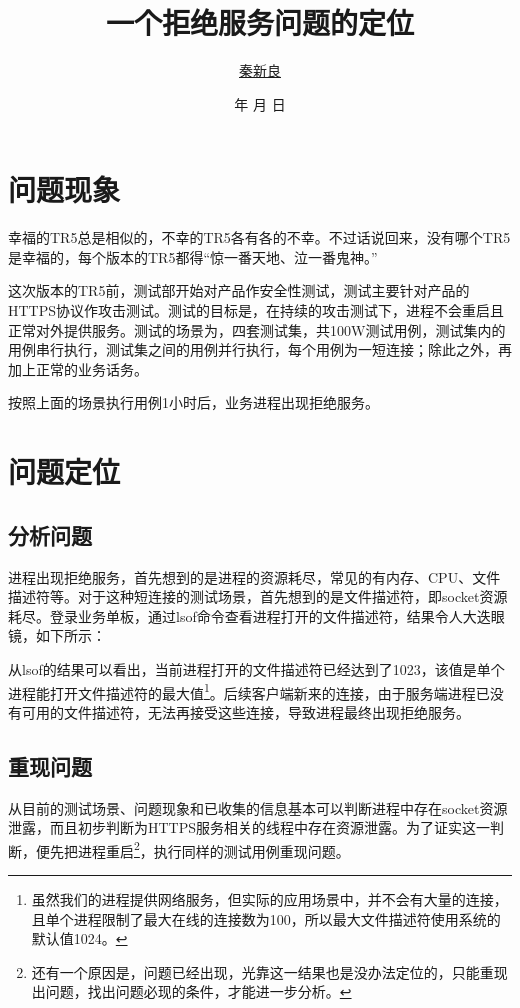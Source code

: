 \documentclass[a4paper, 11pt, titlepage]{article}
\newcommand*{\TitleFont}{\usefont{\encodingdefault}{\rmdefault}{b}{n}\fontsize{32}{40}\selectfont}
\renewcommand{\today}{\number\year 年 \number\month 月 \number\day 日}
\begin{document}
\setlength{\parindent}{2em}

\title{\TitleFont 一个拒绝服务问题的定位}
\author{\href{mailto:foolswonder@gmail.com}{秦新良}}
\date{\today}

\maketitle

\tableofcontents
\newpage

\section{问题现象}
幸福的TR5总是相似的，不幸的TR5各有各的不幸。不过话说回来，没有哪个TR5是幸福的，每个版本的TR5都得“惊一番天地、泣一番鬼神。”

这次版本的TR5前，测试部开始对产品作安全性测试，测试主要针对产品的HTTPS协议作攻击测试。测试的目标是，在持续的攻击测试下，进程不会重启且正常对外提供服务。测试的场景为，四套测试集，共100W测试用例，测试集内的用例串行执行，测试集之间的用例并行执行，每个用例为一短连接；除此之外，再加上正常的业务话务。

按照上面的场景执行用例1小时后，业务进程出现拒绝服务。

\section{问题定位}
\subsection{分析问题}
进程出现拒绝服务，首先想到的是进程的资源耗尽，常见的有内存、CPU、文件描述符等。对于这种短连接的测试场景，首先想到的是文件描述符，即socket资源耗尽。登录业务单板，通过lsof命令查看进程打开的文件描述符，结果令人大迭眼镜，如下所示：


从lsof的结果可以看出，当前进程打开的文件描述符已经达到了1023，该值是单个进程能打开文件描述符的最大值\footnote{虽然我们的进程提供网络服务，但实际的应用场景中，并不会有大量的连接，且单个进程限制了最大在线的连接数为100，所以最大文件描述符使用系统的默认值1024。}。后续客户端新来的连接，由于服务端进程已没有可用的文件描述符，无法再接受这些连接，导致进程最终出现拒绝服务。

\subsection{重现问题}
从目前的测试场景、问题现象和已收集的信息基本可以判断进程中存在socket资源泄露，而且初步判断为HTTPS服务相关的线程中存在资源泄露。为了证实这一判断，便先把进程重启\footnote{还有一个原因是，问题已经出现，光靠这一结果也是没办法定位的，只能重现出问题，找出问题必现的条件，才能进一步分析。}，执行同样的测试用例重现问题。
\end{document}
